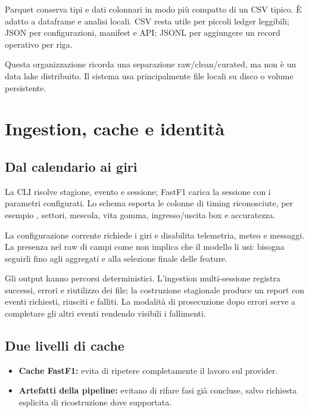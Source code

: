 \documentclass[11pt,a4paper]{article}
\providecommand{\tightlist}{\setlength{\itemsep}{0pt}\setlength{\parskip}{0pt}}
\newcommand{\code}[1]{{\ttfamily\small\seqsplit{#1}}}
\begin{document}
Parquet conserva tipi e dati colonnari in modo più compatto di un CSV tipico. È adatto a dataframe e analisi locali. CSV resta utile per piccoli ledger leggibili; JSON per configurazioni, manifest e API; JSONL per aggiungere un record operativo per riga.

Questa organizzazione ricorda una separazione raw/clean/curated, ma non è un data lake distribuito. Il sistema usa principalmente file locali su disco o volume persistente.

\section{Ingestion, cache e identità}\label{ingestion-cache-e-identituxe0}

\subsection{Dal calendario ai giri}\label{dal-calendario-ai-giri}

La CLI risolve stagione, evento e sessione; FastF1 carica la sessione con i parametri configurati. Lo schema esporta le colonne di timing riconosciute, per esempio \code{LapTime}, settori, mescola, vita gomma, ingresso/uscita box e accuratezza.

La configurazione corrente richiede i giri e disabilita telemetria, meteo e messaggi. La presenza nel raw di campi come \code{SpeedST} non implica che il modello li usi: bisogna seguirli fino agli aggregati e alla selezione finale delle feature.

Gli output hanno percorsi deterministici. L'ingestion multi-sessione registra successi, errori e riutilizzo dei file; la costruzione stagionale produce un report con eventi richiesti, riusciti e falliti. La modalità di prosecuzione dopo errori serve a completare gli altri eventi rendendo visibili i fallimenti.

\subsection{Due livelli di cache}\label{due-livelli-di-cache}

\begin{itemize}
\tightlist
\item
  \textbf{Cache FastF1:} evita di ripetere completamente il lavoro sul provider.
\item
  \textbf{Artefatti della pipeline:} evitano di rifare fasi già concluse, salvo richiesta esplicita di ricostruzione dove supportata.
\end{itemize}
\end{document}
